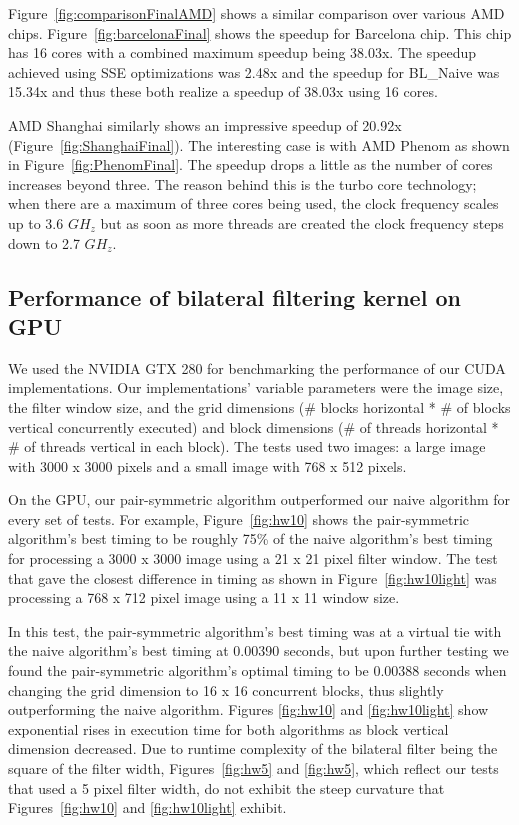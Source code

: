 \documentclass{IEEEtran}
\begin{document}
Figure~\ref{fig:comparisonFinalAMD} shows a similar comparison over various AMD chips. Figure~\ref{fig:barcelonaFinal} shows the speedup for Barcelona chip. This chip has 16 cores with a combined maximum speedup being 38.03x. The speedup achieved using SSE optimizations was 2.48x and the speedup for BL\_Naive was 15.34x and thus these both realize a speedup of 38.03x using 16 cores.

AMD Shanghai similarly shows an impressive speedup of 20.92x (Figure~\ref{fig:ShanghaiFinal}). The interesting case is with AMD Phenom as shown in Figure~\ref{fig:PhenomFinal}. The speedup drops a little as the number of cores increases beyond three. The reason behind this is the turbo core technology; when there are a maximum of three cores being used, the clock frequency scales up to 3.6 $GH_z$ but as soon as more threads are created the clock frequency steps down to 2.7 $GH_z$. 

\subsection{Performance of bilateral filtering kernel on GPU}

We used the NVIDIA GTX 280 for benchmarking the performance of our CUDA implementations. Our implementations' variable parameters were the image size, the filter window size, and the grid dimensions (\# blocks horizontal * \# of blocks vertical concurrently executed) and block dimensions (\# of threads horizontal * \# of threads vertical in each block). The tests used two images: a large image with 3000 x 3000 pixels and a small image with 768 x 512 pixels.

On the GPU, our pair-symmetric algorithm outperformed our naive algorithm for every set of tests. For example, Figure~\ref{fig:hw10} shows the pair-symmetric algorithm's best timing to be roughly 75\% of the naive algorithm's best timing for processing a 3000 x 3000 image using a 21 x 21 pixel filter window. The test that gave the closest difference in timing as shown in Figure~\ref{fig:hw10light} was processing a 768 x 712 pixel image using a 11 x 11 window size. 

In this test, the pair-symmetric algorithm's best timing was at a virtual tie with the naive algorithm's best timing at 0.00390 seconds, but upon further testing we found the pair-symmetric algorithm's optimal timing to be 0.00388 seconds when changing the grid dimension to 16 x 16 concurrent blocks, thus slightly outperforming the naive algorithm. Figures \ref{fig:hw10} and \ref{fig:hw10light} show exponential rises in execution time for both algorithms as block vertical dimension decreased. Due to runtime complexity of the bilateral filter being the square of the filter width, Figures~\ref{fig:hw5} and \ref{fig:hw5}, which reflect our tests that used a 5 pixel filter width, do not exhibit the steep curvature that Figures~\ref{fig:hw10} and \ref{fig:hw10light} exhibit.
\end{document}
